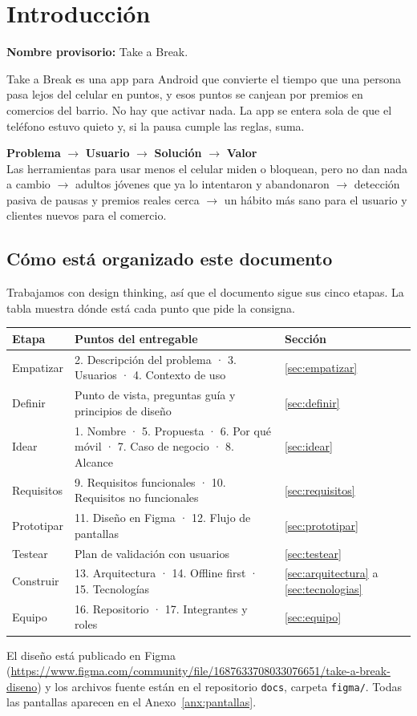 \section{Introducción}

\textbf{Nombre provisorio:} Take a Break.

Take a Break es una app para Android que convierte el tiempo que una persona pasa lejos del celular en puntos, y esos puntos se canjean por premios en comercios del barrio. No hay que activar nada. La app se entera sola de que el teléfono estuvo quieto y, si la pausa cumple las reglas, suma.

\begin{nota}
\centering
\textbf{Problema} $\rightarrow$ \textbf{Usuario} $\rightarrow$ \textbf{Solución} $\rightarrow$ \textbf{Valor}\\[4pt]
Las herramientas para usar menos el celular miden o bloquean, pero no dan nada a cambio
$\rightarrow$ adultos jóvenes que ya lo intentaron y abandonaron
$\rightarrow$ detección pasiva de pausas y premios reales cerca
$\rightarrow$ un hábito más sano para el usuario y clientes nuevos para el comercio.
\end{nota}

\subsection{Cómo está organizado este documento}

Trabajamos con design thinking, así que el documento sigue sus cinco etapas. La tabla muestra dónde está cada punto que pide la consigna.

\begin{table}[H]
\centering\small
\begin{tabularx}{\textwidth}{@{}l L l@{}}
\toprule
\textbf{Etapa} & \textbf{Puntos del entregable} & \textbf{Sección} \\
\midrule
Empatizar  & 2. Descripción del problema · 3. Usuarios · 4. Contexto de uso & \ref{sec:empatizar} \\
Definir    & Punto de vista, preguntas guía y principios de diseño & \ref{sec:definir} \\
Idear      & 1. Nombre · 5. Propuesta · 6. Por qué móvil · 7. Caso de negocio · 8. Alcance & \ref{sec:idear} \\
Requisitos & 9. Requisitos funcionales · 10. Requisitos no funcionales & \ref{sec:requisitos} \\
Prototipar & 11. Diseño en Figma · 12. Flujo de pantallas & \ref{sec:prototipar} \\
Testear    & Plan de validación con usuarios & \ref{sec:testear} \\
Construir  & 13. Arquitectura · 14. Offline first · 15. Tecnologías & \ref{sec:arquitectura} a \ref{sec:tecnologias} \\
Equipo     & 16. Repositorio · 17. Integrantes y roles & \ref{sec:equipo} \\
\bottomrule
\end{tabularx}
\end{table}

El diseño está publicado en Figma (\url{https://www.figma.com/community/file/1687633708033076651/take-a-break-diseno}) y los archivos fuente están en el repositorio \texttt{docs}, carpeta \texttt{figma/}. Todas las pantallas aparecen en el Anexo~\ref{anx:pantallas}.
